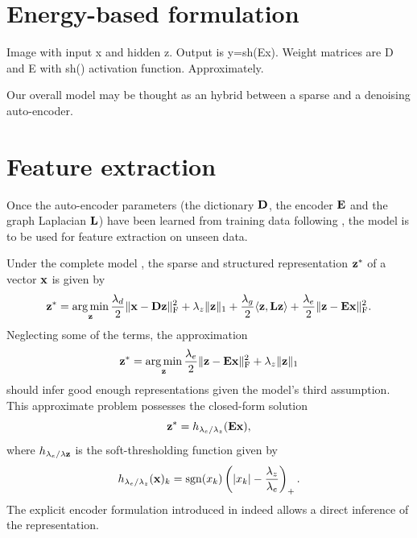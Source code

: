 \section{Energy-based formulation} \label{sec:energy_formulation}


{\color{red} Image with input x and hidden z. Output is y=sh(Ex). Weight matrices are D and E with sh() activation function. Approximately.}


Our overall model may be thought as an hybrid between a sparse and a denoising auto-encoder.


\section{Feature extraction}

Once the auto-encoder parameters (the dictionary $\mathbf{D}$, the encoder $\mathbf{E}$ and the graph Laplacian $\mathbf{L}$) have been learned from training data following  , the model is to be used for feature extraction on unseen data.

Under the complete model , the sparse and structured representation $\mathbf{z}^*$ of a vector $\mathbf{x}$ is given by
\begin{equation} \label{eqn:z_complete}
	\mathbf{z}^* = \operatorname*{arg\,min}\limits_{\mathbf{z}} \frac{\lambda_d}{2} \| \mathbf{x} - \mathbf{D} \mathbf{z} \|_\text{F}^2 + \lambda_z \| \mathbf{z} \|_1 + \frac{\lambda_g}{2} \langle \mathbf{z} , \mathbf{L} \mathbf{z} \rangle + \frac{\lambda_e}{2} \| \mathbf{z} - \mathbf{E} \mathbf{x} \|_\text{F}^2.
\end{equation}
Neglecting some of the terms, the approximation
\begin{equation} \label{eqn:z_approximate}
	\mathbf{z}^* = \operatorname*{arg\,min}\limits_{\mathbf{z}} \frac{\lambda_e}{2} \| \mathbf{z} - \mathbf{E} \mathbf{x} \|_\text{F}^2 + \lambda_z \| \mathbf{z} \|_1
\end{equation}
should infer good enough representations given the model's third assumption. This approximate problem possesses the closed-form solution
\begin{equation} \label{eqn:z_direct}
	\mathbf{z}^* = h_{\lambda_e / \lambda_z} (\mathbf{E} \mathbf{x}),
\end{equation}
where $h_{\lambda_e / \lambda\mathbf{z}}$ is the soft-thresholding function given by
\begin{equation}
	h_{\lambda_e / \lambda_z}(\mathbf{x})_k = \operatorname*{sgn}(x_k) \left( |x_k| - \frac{\lambda_z}{\lambda_e} \right)_+.
\end{equation}
The explicit encoder formulation introduced in  indeed allows a direct inference of the representation.


